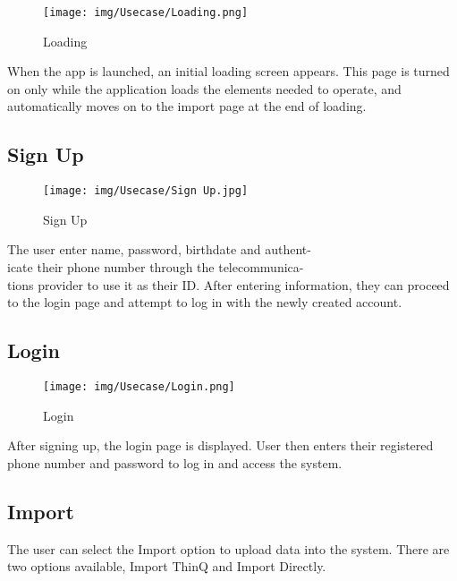 \documentclass[conference]{IEEEtran}
\begin{document}
\begin{figure}[h]
\hspace{1.5cm}
\centering
\begin{minipage}{0.4\columnwidth}
    \texttt{[image: img/Usecase/Loading.png]}
    \caption{Loading}
\end{minipage}
\end{figure}
When the app is launched, an initial loading screen appears. This page is turned on only while the application loads the elements needed to operate, and automatically moves on to the import page at the end of loading. \\

\subsection{Sign Up}
\begin{figure}[h]
\hspace{1.5cm}
\centering
\begin{minipage}{0.4\columnwidth}
    \texttt{[image: img/Usecase/Sign Up.jpg]}
    \caption{Sign Up}
\end{minipage}
\end{figure}
The user enter name, password, birthdate and authent-\\icate their phone number through the telecommunica-\\tions provider to use it as their ID. After entering information, they can proceed to the login page and attempt to log in with the newly created account. \\

\subsection{Login}
\begin{figure}[h]
\hspace{1.5cm}
\centering
\begin{minipage}{0.4\columnwidth}
    \texttt{[image: img/Usecase/Login.png]}
    \caption{Login}
\end{minipage}
\end{figure}
After signing up, the login page is displayed. User then enters their registered phone number and password to log in and access the system. \\

\subsection{Import}
The user can select the Import option to upload data into the system. There are two options available, Import ThinQ
and Import Directly. \\
\end{document}
